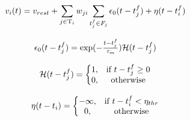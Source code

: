 \begin{equation}
\begin{matrix}
\displaystyle v_i(t)=v_{rest}+\sum_{j\in \Tau_i }w_{ji}\sum_{t_j^f\in F_j}\epsilon_0(t-t_j^f)+\eta(t-t_i^f) \\ \\

\epsilon_0(t-t_j^f)=\exp(-\frac{t-t_j^f}{\tau_m})\mathcal{H}(t-t_j^f)\\ \\

\mathcal{H}(t-t_j^f)=\left\{
\begin{array}{@{}cc@{}}
1, & \text{if}\ t-t_j^f\geq 0 \\
0, & \text{otherwise}
\end{array}\right.  \\ \\

\eta(t-t_i)=\left\{
\begin{array}{@{}cc@{}}
-\infty, & \text{if}\ t-t_i^f<\eta_{thr}\\
0, & \text{otherwise}
\end{array}\right.

\end{matrix}
\label{eq:SRM_multimodal_neucube}
\end{equation} 

